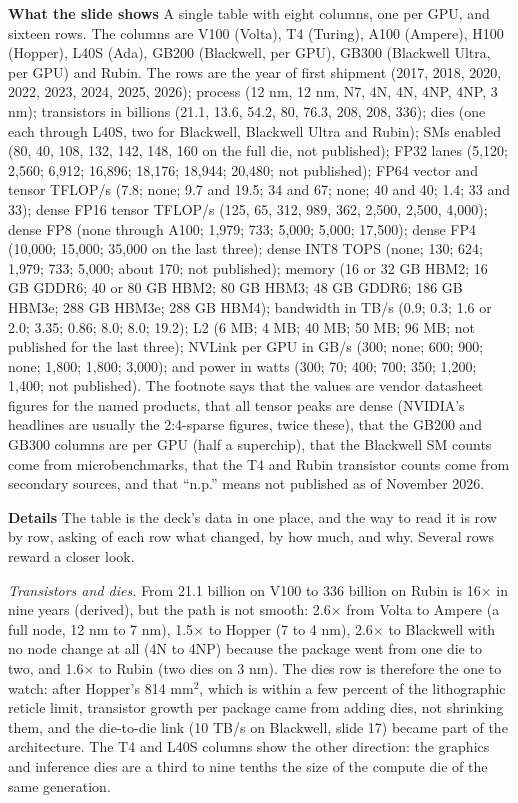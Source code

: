 \documentclass[11pt,letterpaper]{article}
\newcommand{\para}[1]{\medskip\noindent\textbf{#1}\quad}
\begin{document}
\para{What the slide shows} A single table with eight columns, one per GPU, and sixteen rows. The columns are V100 (Volta), T4 (Turing), A100 (Ampere), H100 (Hopper), L40S (Ada), GB200 (Blackwell, per GPU), GB300 (Blackwell Ultra, per GPU) and Rubin. The rows are the year of first shipment (2017, 2018, 2020, 2022, 2023, 2024, 2025, 2026); process (12 nm, 12 nm, N7, 4N, 4N, 4NP, 4NP, 3 nm); transistors in billions (21.1, 13.6, 54.2, 80, 76.3, 208, 208, 336); dies (one each through L40S, two for Blackwell, Blackwell Ultra and Rubin); SMs enabled (80, 40, 108, 132, 142, 148, 160 on the full die, not published); FP32 lanes (5,120; 2,560; 6,912; 16,896; 18,176; 18,944; 20,480; not published); FP64 vector and tensor TFLOP/s (7.8; none; 9.7 and 19.5; 34 and 67; none; 40 and 40; 1.4; 33 and 33); dense FP16 tensor TFLOP/s (125, 65, 312, 989, 362, 2,500, 2,500, 4,000); dense FP8 (none through A100; 1,979; 733; 5,000; 5,000; 17,500); dense FP4 (10,000; 15,000; 35,000 on the last three); dense INT8 TOPS (none; 130; 624; 1,979; 733; 5,000; about 170; not published); memory (16 or 32 GB HBM2; 16 GB GDDR6; 40 or 80 GB HBM2; 80 GB HBM3; 48 GB GDDR6; 186 GB HBM3e; 288 GB HBM3e; 288 GB HBM4); bandwidth in TB/s (0.9; 0.3; 1.6 or 2.0; 3.35; 0.86; 8.0; 8.0; 19.2); L2 (6 MB; 4 MB; 40 MB; 50 MB; 96 MB; not published for the last three); NVLink per GPU in GB/s (300; none; 600; 900; none; 1,800; 1,800; 3,000); and power in watts (300; 70; 400; 700; 350; 1,200; 1,400; not published). The footnote says that the values are vendor datasheet figures for the named products, that all tensor peaks are dense (NVIDIA's headlines are usually the 2:4-sparse figures, twice these), that the GB200 and GB300 columns are per GPU (half a superchip), that the Blackwell SM counts come from microbenchmarks, that the T4 and Rubin transistor counts come from secondary sources, and that ``n.p.'' means not published as of November 2026.

\para{Details} The table is the deck's data in one place, and the way to read it is row by row, asking of each row what changed, by how much, and why. Several rows reward a closer look.

\emph{Transistors and dies.} From 21.1 billion on V100 to 336 billion on Rubin is 16$\times$ in nine years (derived), but the path is not smooth: 2.6$\times$ from Volta to Ampere (a full node, 12 nm to 7 nm), 1.5$\times$ to Hopper (7 to 4 nm), 2.6$\times$ to Blackwell with no node change at all (4N to 4NP) because the package went from one die to two, and 1.6$\times$ to Rubin (two dies on 3 nm). The dies row is therefore the one to watch: after Hopper's 814 mm$^2$, which is within a few percent of the lithographic reticle limit, transistor growth per package came from adding dies, not shrinking them, and the die-to-die link (10 TB/s on Blackwell, slide 17) became part of the architecture. The T4 and L40S columns show the other direction: the graphics and inference dies are a third to nine tenths the size of the compute die of the same generation.
\end{document}
